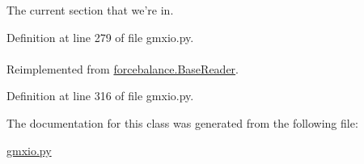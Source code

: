 \-The current section that we're in. 



\-Definition at line 279 of file gmxio.\-py.

\hypertarget{classforcebalance_1_1gmxio_1_1ITP__Reader_ab35c32e7ecf74028641613f90906bd37}{
\paragraph[{suffix}]{}}\label{classforcebalance_1_1gmxio_1_1ITP__Reader_ab35c32e7ecf74028641613f90906bd37}


\-Reimplemented from \hyperlink{classforcebalance_1_1BaseReader_a48ef0584a1b6b4b6f8eb741ad8465db8}{forcebalance.\-Base\-Reader}.



\-Definition at line 316 of file gmxio.\-py.



\-The documentation for this class was generated from the following file\-:\begin{DoxyCompactItemize}
\item 
\hyperlink{gmxio_8py}{gmxio.\-py}\end{DoxyCompactItemize}
